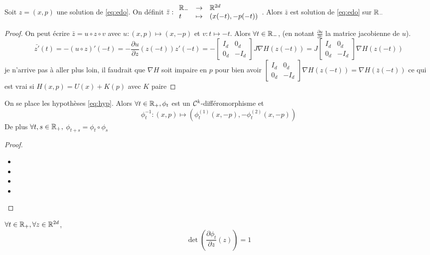 \documentclass[10pt,a4paper]{article}
\newcommand{\red}{\color{red}}
\begin{document}
\begin{Lem}\label{lem:sol-inverse}
  Soit $z = (x,p)$ une solution de \eqref{eq:edo}. On définit $\bar{z} : { \begin{array}{lcl} \mathbb{R}_{-} & \to & \mathbb{R}^{2d} \\ t & \mapsto & (x(-t), -p(-t)) \end{array} }$. Alors $\bar{z}$ est solution de \eqref{eq:edo} sur $\mathbb{R}_{-}$
\end{Lem}
\begin{proof}
  On peut écrire $\bar{z} = u \circ z \circ v$ avec $u : (x,p) \mapsto (x, -p)$ et $v : t \mapsto -t$. Alors $\forall t \in \mathbb{R}_{-}$, (en notant $\frac{\partial u}{\partial z}$ la matrice jacobienne de $u$). 
  $$
  \bar{z'}(t) = - (u \circ z)'(-t) = - \frac{\partial u}{\partial z}(z(-t)) z'(-t) = -
  \begin{bmatrix}
    I_{d} & 0_{d} \\
    0_{d} & - I_{d}
  \end{bmatrix}
  J \nabla H(z(-t))
  = J  \begin{bmatrix}
    I_{d} & 0_{d} \\
    0_{d} & - I_{d}
  \end{bmatrix}
  \nabla H(z(-t))
  $$
  {\red je n'arrive pas à aller plus loin, il faudrait que $\nabla H$ soit impaire en $p$ pour bien avoir $\begin{bmatrix}
    I_{d} & 0_{d} \\
    0_{d} & - I_{d}
  \end{bmatrix}
  \nabla H(z(-t)) = \nabla H(\bar{z}(-t))$ ce qui est vrai si $H(x,p) = U(x) + K(p)$ avec $K$ paire}
\end{proof}


\begin{Prop}[réversibilité]\label{prop:rev}
  On se place les hypothèses \eqref{eq:hyp}. Alors $\forall t \in \mathbb{R}_+, \phi_t$ est un $\mathcal{C}^k$-différomorphisme et
  $$
  \phi_t^{-1} : (x,p) \mapsto (\phi_t^{(1)}(x, -p), - \phi_t^{(2)}(x, -p))
  $$
  De plus $\forall t, s \in \mathbb{R}_+,$ $\phi_{t+s} = \phi_t \circ \phi_s$ 
\end{Prop}
\begin{proof}
  \begin{itemize}
  \item 
  \item 
  \item
  \item 
  \end{itemize}
\end{proof}


\begin{Prop}\label{prop:vol}
  $\forall t \in \mathbb{R}_+, \forall z \in \mathbb{R}^{2d}$,
  $$
  \det \left( \frac{\partial \phi_t}{\partial z}(z) \right) = 1
  $$
\end{Prop}
\end{document}
